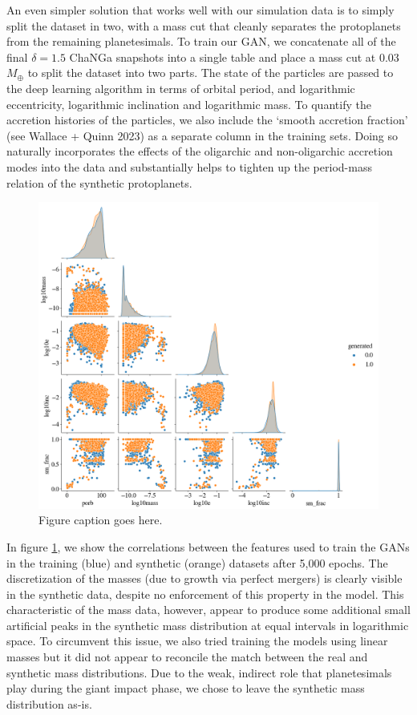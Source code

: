 An even simpler solution that works well with our simulation data is to simply split the dataset in two, with a mass cut that cleanly separates the protoplanets from the remaining planetesimals. To train our GAN, we concatenate all of the final $\delta = 1.5$ {\sc ChaNGa} snapshots into a single table and place a mass cut at 0.03 $M_{\oplus}$ to split the dataset into two parts. The state of the particles are passed to the deep learning algorithm in terms of orbital period, and logarithmic eccentricity, logarithmic inclination and logarithmic mass. To quantify the accretion histories of the particles, we also include the `smooth accretion fraction' (see Wallace + Quinn 2023) as a separate column in the training sets. Doing so naturally incorporates the effects of the oligarchic and non-oligarchic accretion modes into the data and substantially helps to tighten up the period-mass relation of the synthetic protoplanets.

\begin{figure}
\begin{center}
    \includegraphics[width=\textwidth]{figures/stip/real_syn_corner.png}
    \caption{Figure caption goes here.\label{fig:real_syn_corner}}
\end{center}
\end{figure}

In figure \ref{fig:real_syn_corner}, we show the correlations between the features used to train the GANs in the training (blue) and synthetic (orange) datasets after 5,000 epochs. The discretization of the masses (due to growth via perfect mergers) is clearly visible in the synthetic data, despite no enforcement of this property in the model. This characteristic of the mass data, however, appear to produce some additional small artificial peaks in the synthetic mass distribution at equal intervals in logarithmic space. To circumvent this issue, we also tried training the models using linear masses but it did not appear to reconcile the match between the real and synthetic mass distributions. Due to the weak, indirect role that planetesimals play during the giant impact phase, we chose to leave the synthetic mass distribution as-is.

